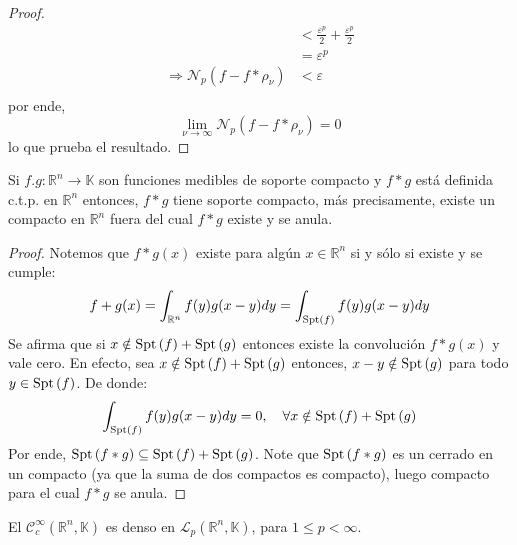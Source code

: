 \documentclass[12pt]{report}
\theoremstyle{largebreak}
\newcommand\cf[3]{\ensuremath{#1:#2\rightarrow#3}}
\newcommand{\N}[2]{\ensuremath{\mathcal{N}_{#1}\left(#2\right)}}
\newcommand{\Spt}[1]{\ensuremath{\textup{Spt}\left(#1\right)}}
\begin{document}
\begin{proof}
\begin{equation*}
\begin{split}
                &<\frac{\varepsilon^p}{2}+\frac{\varepsilon^p}{2}\\
                &=\varepsilon^p\\
                \Rightarrow \N{p}{f-f*\rho_\nu}&<\varepsilon\\
            \end{split}
        \end{equation*}
        por ende,
        \begin{equation*}
            \lim_{\nu\rightarrow\infty}\N{p}{f-f*\rho_\nu}=0
        \end{equation*}
        lo que prueba el resultado.
    \end{proof}

    \begin{lema}
        Si $\cf{f.g}{\mathbb{R}^n}{\mathbb{K}}$ son funciones medibles de soporte compacto y $f*g$ está definida c.t.p. en $\mathbb{R}^n$ entonces, $f*g$ tiene soporte compacto, más precisamente, existe un compacto en $\mathbb{R}^n$ fuera del cual $f*g$ existe y se anula. 
    \end{lema}

    \begin{proof}
        Notemos que $f*g(x)$ existe para algún $x\in\mathbb{R}^n$ si y sólo si existe y se cumple:
        \begin{equation*}
            f+g(x)=\int_{\mathbb{R}^n}f(y)g(x-y)dy=\int_{\Spt{f}}f(y)g(x-y)dy
        \end{equation*}
        Se afirma que si $x\notin\Spt{f}+\Spt{g}$ entonces existe la convolución $f*g(x)$ y vale cero. En efecto, sea $x\notin \Spt{f}+\Spt{g}$ entonces, $x-y\notin\Spt{g}$ para todo $y\in\Spt{f}$. De donde:
        \begin{equation*}
            \int_{\Spt{f}}f(y)g(x-y)dy=0,\quad\forall x\notin\Spt{f}+\Spt{g}
        \end{equation*}
        Por ende, $\Spt{f*g}\subseteq\Spt{f}+\Spt{g}$. Note que $\Spt{f*g}$ es un cerrado en un compacto (ya que la suma de dos compactos es compacto), luego compacto para el cual $f*g$ se anula.
    \end{proof}

    \begin{theor}
        El $\mathcal{C}^\infty_c(\mathbb{R}^n,\mathbb{K})$ es denso en $\mathcal{L}_p(\mathbb{R}^n,\mathbb{K})$, para $1\leq p<\infty$.
    \end{theor}
\end{document}
